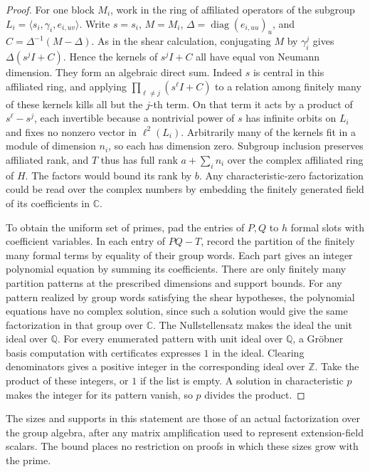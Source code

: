 \documentclass[11pt,a4paper]{article}
\numberwithin{equation}{section}
\begin{document}
\begin{proof}
For one block \(M_i\), work in the ring of affiliated operators of the subgroup \(L_i=\langle s_i,\gamma_i,e_{i,uv}\rangle\). Write \(s=s_i\), \(M=M_i\), \(\Delta=\operatorname{diag}(e_{i,uu})_u\), and \(C=\Delta^{-1}(M-\Delta)\). As in the shear calculation, conjugating \(M\) by \(\gamma_i^j\) gives \(\Delta(s^jI+C)\). Hence the kernels of \(s^jI+C\) all have equal von Neumann dimension. They form an algebraic direct sum. Indeed \(s\) is central in this affiliated ring, and applying \(\prod_{\ell\ne j}(s^\ell I+C)\) to a relation among finitely many of these kernels kills all but the \(j\)-th term. On that term it acts by a product of \(s^\ell-s^j\), each invertible because a nontrivial power of \(s\) has infinite orbits on \(L_i\) and fixes no nonzero vector in \(\ell^2(L_i)\). Arbitrarily many of the kernels fit in a module of dimension \(n_i\), so each has dimension zero. Subgroup inclusion preserves affiliated rank, and \(T\) thus has full rank \(a+\sum_i n_i\) over the complex affiliated ring of \(H\). The factors would bound its rank by \(b\). Any characteristic-zero factorization could be read over the complex numbers by embedding the finitely generated field of its coefficients in \(\mathbb C\).

To obtain the uniform set of primes, pad the entries of \(P,Q\) to \(h\) formal slots with coefficient variables. In each entry of \(PQ-T\), record the partition of the finitely many formal terms by equality of their group words. Each part gives an integer polynomial equation by summing its coefficients. There are only finitely many partition patterns at the prescribed dimensions and support bounds. For any pattern realized by group words satisfying the shear hypotheses, the polynomial equations have no complex solution, since such a solution would give the same factorization in that group over \(\mathbb C\). The Nullstellensatz makes the ideal the unit ideal over \(\mathbb Q\). For every enumerated pattern with unit ideal over \(\mathbb Q\), a Gr\"obner basis computation with certificates expresses \(1\) in the ideal. Clearing denominators gives a positive integer in the corresponding ideal over \(\mathbb Z\). Take the product of these integers, or \(1\) if the list is empty. A solution in characteristic \(p\) makes the integer for its pattern vanish, so \(p\) divides the product.
\end{proof}

The sizes and supports in this statement are those of an actual factorization over the group algebra, after any matrix amplification used to represent extension-field scalars. The bound places no restriction on proofs in which these sizes grow with the prime.
\end{document}
